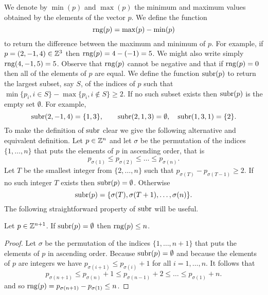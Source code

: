 \documentclass[final,leqno]{siamltex}
\begin{document}
We denote by $\min(p)$ and $\max(p)$ the minimum and maximum values obtained by the elements of the vector $p$.  We define the function
\[
\operatorname{rng}(p) = \max(p) - \min(p)
\] 
to return the difference between the maximum and minimum of $p$.  For example, if $p = (2,-1,4) \in {\mathbb Z}^3$ then $\operatorname{rng}(p) = 4 - (-1)=5$.  We might also write simply $\operatorname{rng}(4,-1,5)=5$.  Observe that $\operatorname{rng}(p)$ cannot be negative and that if $\operatorname{rng}(p) = 0$ then all of the elements of $p$ are equal.  We define the function $\operatorname{subr}(p)$ to return the largest subset, say $S$, of the indices of $p$ such that $\min\{p_i, i \in S\} - \max\{p_i, i \notin S\} \geq 2.$  If no such subset exists then $\operatorname{subr}(p)$ is the empty set $\emptyset$.  For example, 
\[
\operatorname{subr}(2,-1,4) = \{1,3\}, \qquad \operatorname{subr}(2,1,3) = \emptyset, \quad  \operatorname{subr}(1,3,1) = \{2\}.
\]  
To make the definition of $\operatorname{subr}$ clear we give the following alternative and equivalent definition.  Let $p \in {\mathbb Z}^n$ and let $\sigma$ be the permutation of the indices $\{1,\dots,n\}$ that puts the elements of $p$ in ascending order, that is
\[
p_{\sigma(1)} \leq p_{\sigma(2)} \leq \dots \leq p_{\sigma(n)}.
\]  
Let $T$ be the smallest integer from $\{2,\dots,n\}$ such that $p_{\sigma(T)} - p_{\sigma(T-1)} \geq 2$.  If no such integer $T$ exists then $\operatorname{subr}(p) = \emptyset$.  Otherwise 
\[
\operatorname{subr}(p) =  \{ \sigma(T), \sigma(T+1), \dots, \sigma(n) \}.
\]
The following straightforward property of $\operatorname{subr}$ will be useful.

\begin{proposition}\label{prop:subrrngsmall}
Let $p \in {\mathbb Z}^{n+1}$.  If $\operatorname{subr}(p) = \emptyset$ then $\operatorname{rng}(p) \leq n$.
\end{proposition}
\begin{proof}
Let $\sigma$ be the permutation of the indices $\{1,\dots,n+1\}$ that puts the elements of $p$ in ascending order.  Because $\operatorname{subr}(p) = \emptyset$ and because the elements of $p$ are integers we have $p_{\sigma(i+1)} \leq p_{\sigma(i)} + 1$ for all $i=1,\dots,n$.  It follows that
\[
p_{\sigma(n+1)} \leq p_{\sigma(n)} + 1 \leq p_{\sigma(n-1)} + 2 \leq \dots \leq p_{\sigma(1)} + n.
\]
and so $\operatorname{rng}(p) = p_{\sigma(n+1)} - p_{\sigma(1)} \leq n$.
\end{proof}
\end{document}
